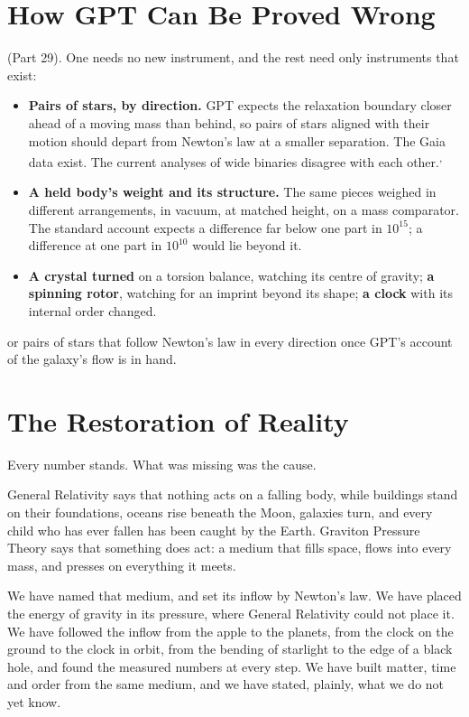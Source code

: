 \section{How GPT Can Be Proved Wrong}

 (Part 29). One needs no new instrument, and the rest need only instruments that exist:
\begin{itemize}
\item \textbf{Pairs of stars, by direction.} GPT expects the relaxation boundary closer ahead of a moving mass than behind, so pairs of stars aligned with their motion should depart from Newton's law at a smaller separation. The Gaia data exist. The current analyses of wide binaries disagree with each other.\textsuperscript{,}
\item \textbf{A held body's weight and its structure.} The same pieces weighed in different arrangements, in vacuum, at matched height, on a mass comparator. The standard account expects a difference far below one part in $10^{15}$; a difference at one part in $10^{10}$ would lie beyond it.
\item \textbf{A crystal turned} on a torsion balance, watching its centre of gravity; \textbf{a spinning rotor}, watching for an imprint beyond its shape; \textbf{a clock} with its internal order changed.
\end{itemize}
 or pairs of stars that follow Newton's law in every direction once GPT's account of the galaxy's flow is in hand.

\clearpage
\section*{The Restoration of Reality}

Every number stands. What was missing was the cause.

General Relativity says that nothing acts on a falling body, while buildings stand on their foundations, oceans rise beneath the Moon, galaxies turn, and every child who has ever fallen has been caught by the Earth. Graviton Pressure Theory says that something does act: a medium that fills space, flows into every mass, and presses on everything it meets.

We have named that medium, and set its inflow by Newton's law. We have placed the energy of gravity in its pressure, where General Relativity could not place it. We have followed the inflow from the apple to the planets, from the clock on the ground to the clock in orbit, from the bending of starlight to the edge of a black hole, and found the measured numbers at every step. We have built matter, time and order from the same medium, and we have stated, plainly, what we do not yet know.

